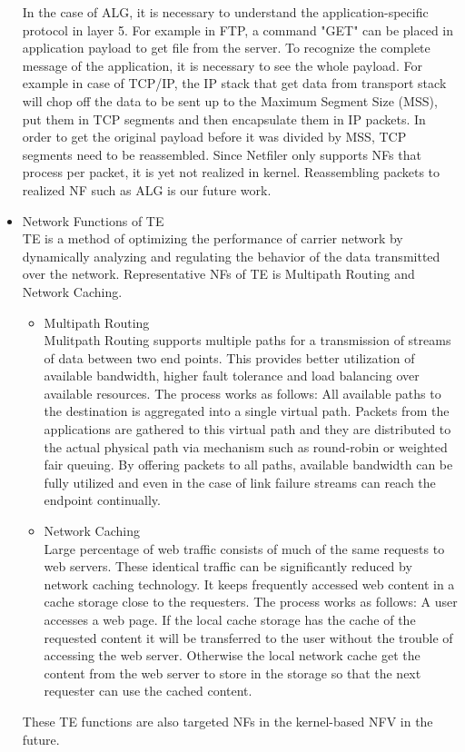 \begin{itemize}
		In the case of ALG, it is necessary to understand the application-specific protocol in layer 5. For example in FTP, a command "GET" can be placed in application payload to get file from the server. To recognize the complete message of the application, it is necessary to see the whole payload. For example in case of TCP/IP, the IP stack that get data from transport stack will chop off the data to be sent up to the Maximum Segment Size (MSS), put them in TCP segments and then encapsulate them in IP packets. In order to get the original payload before it was divided by MSS, TCP segments need to be reassembled. Since Netfiler only supports NFs that process per packet, it is yet not realized in kernel. Reassembling packets to realized NF such as ALG is our future work.
		
	\item Network Functions of TE\\
		TE is a method of optimizing the performance of carrier network by dynamically analyzing and regulating the behavior of the data transmitted over the network. Representative NFs of TE is Multipath Routing and Network Caching. 
		\begin{itemize}
			\item Multipath Routing\\
				Mulitpath Routing supports multiple paths for a transmission of streams of data between two end points. This provides better utilization of available bandwidth, higher fault tolerance and load balancing over available resources. The process works as follows: All available paths to the destination is aggregated into a single virtual path. Packets from the applications are gathered to this virtual path and they are distributed to the actual physical path via mechanism such as round-robin or weighted fair queuing. By offering packets to all paths, available bandwidth can be fully utilized and even in the case of link failure streams can reach the endpoint continually.  
			\item Network Caching\\
				Large percentage of web traffic consists of much of the same requests to web servers. These identical traffic can be significantly reduced by network caching technology. It keeps frequently accessed web content in a cache storage close to the requesters. The process works as follows: A user accesses a web page. If the local cache storage has the cache of the requested content it will be transferred to the user without the trouble of accessing the web server. Otherwise the local network cache get the content from the web server to store in the storage so that the next requester can use the cached content. 
		\end{itemize}
		These TE functions are also targeted NFs in the kernel-based NFV in the future. 
\end{itemize}

